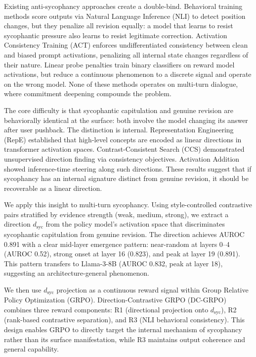 \documentclass[11pt,a4paper]{article}
\newcommand{\dsyc}{d_{\text{syc}}}
\begin{document}
Existing anti-sycophancy approaches create a double-bind. Behavioral training methods score outputs via Natural Language Inference (NLI) to detect position changes, but they penalize all revision equally: a model that learns to resist sycophantic pressure also learns to resist legitimate correction. Activation Consistency Training (ACT) enforces undifferentiated consistency between clean and biased prompt activations, penalizing all internal state changes regardless of their nature. Linear probe penalties train binary classifiers on reward model activations, but reduce a continuous phenomenon to a discrete signal and operate on the wrong model. None of these methods operates on multi-turn dialogue, where commitment deepening compounds the problem.

The core difficulty is that sycophantic capitulation and genuine revision are behaviorally identical at the surface: both involve the model changing its answer after user pushback. The distinction is internal. Representation Engineering (RepE) established that high-level concepts are encoded as linear directions in transformer activation spaces. Contrast-Consistent Search (CCS) demonstrated unsupervised direction finding via consistency objectives. Activation Addition showed inference-time steering along such directions. These results suggest that if sycophancy has an internal signature distinct from genuine revision, it should be recoverable as a linear direction.

We apply this insight to multi-turn sycophancy. Using style-controlled contrastive pairs stratified by evidence strength (weak, medium, strong), we extract a direction $\dsyc$ from the policy model's activation space that discriminates sycophantic capitulation from genuine revision. The direction achieves AUROC 0.891 with a clear mid-layer emergence pattern: near-random at layers 0--4 (AUROC 0.52), strong onset at layer 16 (0.823), and peak at layer 19 (0.891). This pattern transfers to Llama-3-8B (AUROC 0.832, peak at layer 18), suggesting an architecture-general phenomenon.

We then use $\dsyc$ projection as a continuous reward signal within Group Relative Policy Optimization (GRPO). Direction-Contrastive GRPO (DC-GRPO) combines three reward components: R1 (directional projection onto $\dsyc$), R2 (rank-based contrastive separation), and R3 (NLI behavioral consistency). This design enables GRPO to directly target the internal mechanism of sycophancy rather than its surface manifestation, while R3 maintains output coherence and general capability.
\end{document}
